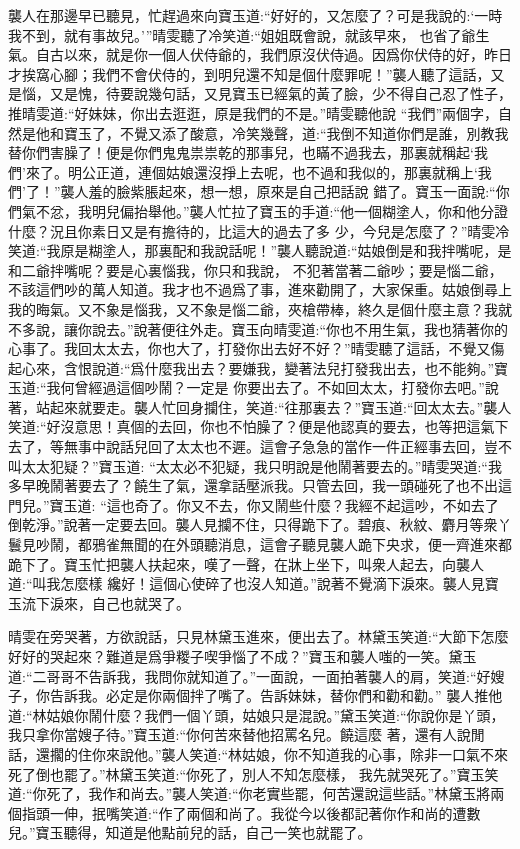 \begin{parag}
    襲人在那邊早已聽見，忙趕過來向寶玉道:“好好的，又怎麼了？可是我說的:‘一時我不到，就有事故兒。’”晴雯聽了冷笑道:“姐姐既會說，就該早來， 也省了爺生氣。自古以來，就是你一個人伏侍爺的，我們原沒伏侍過。因爲你伏侍的好，昨日才挨窩心腳；我們不會伏侍的，到明兒還不知是個什麼罪呢！”襲人聽了這話，又是惱，又是愧，待要說幾句話，又見寶玉已經氣的黃了臉，少不得自己忍了性子，推晴雯道:“好妹妹，你出去逛逛，原是我們的不是。”晴雯聽他說 “我們”兩個字，自然是他和寶玉了，不覺又添了酸意，冷笑幾聲，道:“我倒不知道你們是誰，別教我替你們害臊了！便是你們鬼鬼祟祟乾的那事兒，也瞞不過我去，那裏就稱起‘我們’來了。明公正道，連個姑娘還沒掙上去呢，也不過和我似的，那裏就稱上‘我們’了！”襲人羞的臉紫脹起來，想一想，原來是自己把話說 錯了。寶玉一面說:“你們氣不忿，我明兒偏抬舉他。”襲人忙拉了寶玉的手道:“他一個糊塗人，你和他分證什麼？況且你素日又是有擔待的，比這大的過去了多 少，今兒是怎麼了？”晴雯冷笑道:“我原是糊塗人，那裏配和我說話呢！”襲人聽說道:“姑娘倒是和我拌嘴呢，是和二爺拌嘴呢？要是心裏惱我，你只和我說， 不犯著當著二爺吵；要是惱二爺，不該這們吵的萬人知道。我才也不過爲了事，進來勸開了，大家保重。姑娘倒尋上我的晦氣。又不象是惱我，又不象是惱二爺，夾槍帶棒，終久是個什麼主意？我就不多說，讓你說去。”說著便往外走。寶玉向晴雯道:“你也不用生氣，我也猜著你的心事了。我回太太去，你也大了，打發你出去好不好？”晴雯聽了這話，不覺又傷起心來，含恨說道:“爲什麼我出去？要嫌我，變著法兒打發我出去，也不能夠。”寶玉道:“我何曾經過這個吵鬧？一定是 你要出去了。不如回太太，打發你去吧。”說著，站起來就要走。襲人忙回身攔住，笑道:“往那裏去？”寶玉道:“回太太去。”襲人笑道:“好沒意思！真個的去回，你也不怕臊了？便是他認真的要去，也等把這氣下去了，等無事中說話兒回了太太也不遲。這會子急急的當作一件正經事去回，豈不叫太太犯疑？”寶玉道: “太太必不犯疑，我只明說是他鬧著要去的。”晴雯哭道:“我多早晚鬧著要去了？饒生了氣，還拿話壓派我。只管去回，我一頭碰死了也不出這門兒。”寶玉道: “這也奇了。你又不去，你又鬧些什麼？我經不起這吵，不如去了倒乾淨。”說著一定要去回。襲人見攔不住，只得跪下了。碧痕、秋紋、麝月等衆丫鬟見吵鬧，都鴉雀無聞的在外頭聽消息，這會子聽見襲人跪下央求，便一齊進來都跪下了。寶玉忙把襲人扶起來，嘆了一聲，在牀上坐下，叫衆人起去，向襲人道:“叫我怎麼樣 纔好！這個心使碎了也沒人知道。”說著不覺滴下淚來。襲人見寶玉流下淚來，自己也就哭了。
\end{parag}


\begin{parag}
    晴雯在旁哭著，方欲說話，只見林黛玉進來，便出去了。林黛玉笑道:“大節下怎麼好好的哭起來？難道是爲爭糉子喫爭惱了不成？”寶玉和襲人嗤的一笑。黛玉道:“二哥哥不告訴我，我問你就知道了。”一面說，一面拍著襲人的肩，笑道:“好嫂子，你告訴我。必定是你兩個拌了嘴了。告訴妹妹，替你們和勸和勸。” 襲人推他道:“林姑娘你鬧什麼？我們一個丫頭，姑娘只是混說。”黛玉笑道:“你說你是丫頭，我只拿你當嫂子待。”寶玉道:“你何苦來替他招罵名兒。饒這麼 著，還有人說閒話，還擱的住你來說他。”襲人笑道:“林姑娘，你不知道我的心事，除非一口氣不來死了倒也罷了。”林黛玉笑道:“你死了，別人不知怎麼樣， 我先就哭死了。”寶玉笑道:“你死了，我作和尚去。”襲人笑道:“你老實些罷，何苦還說這些話。”林黛玉將兩個指頭一伸，抿嘴笑道:“作了兩個和尚了。我從今以後都記著你作和尚的遭數兒。”寶玉聽得，知道是他點前兒的話，自己一笑也就罷了。
\end{parag}


